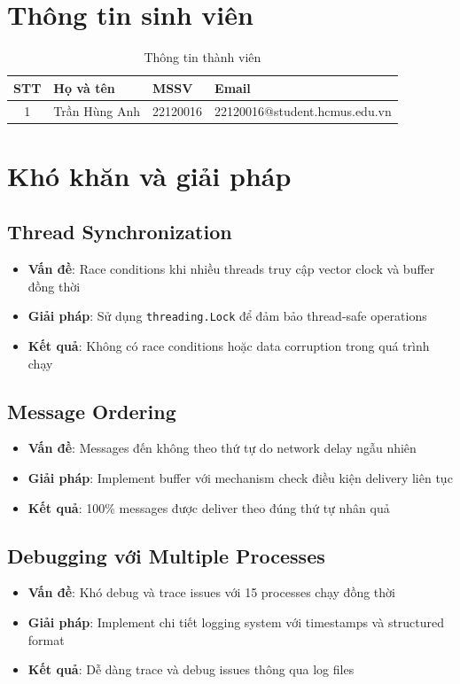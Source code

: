 \section{Thông tin sinh viên}

\begin{table}[h!]
    \centering
    \begin{tabular}{|c|l|l|l|} \hline
        \textbf{STT} & \textbf{Họ và tên} & \textbf{MSSV} & \textbf{Email} \\ \hline
        1 & Trần Hùng Anh & 22120016 & 22120016@student.hcmus.edu.vn \\ \hline
    \end{tabular}
    \caption{Thông tin thành viên}
    \label{tab:group}
\end{table}

\section{Khó khăn và giải pháp}

\subsection{Thread Synchronization}
\begin{itemize}
    \item \textbf{Vấn đề}: Race conditions khi nhiều threads truy cập vector clock và buffer đồng thời
    \item \textbf{Giải pháp}: Sử dụng \texttt{threading.Lock} để đảm bảo thread-safe operations
    \item \textbf{Kết quả}: Không có race conditions hoặc data corruption trong quá trình chạy
\end{itemize}

\subsection{Message Ordering}
\begin{itemize}
    \item \textbf{Vấn đề}: Messages đến không theo thứ tự do network delay ngẫu nhiên
    \item \textbf{Giải pháp}: Implement buffer với mechanism check điều kiện delivery liên tục
    \item \textbf{Kết quả}: 100\% messages được deliver theo đúng thứ tự nhân quả
\end{itemize}

\subsection{Debugging với Multiple Processes}
\begin{itemize}
    \item \textbf{Vấn đề}: Khó debug và trace issues với 15 processes chạy đồng thời
    \item \textbf{Giải pháp}: Implement chi tiết logging system với timestamps và structured format
    \item \textbf{Kết quả}: Dễ dàng trace và debug issues thông qua log files
\end{itemize}


